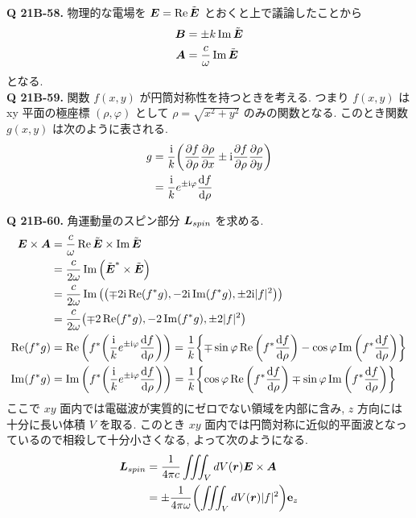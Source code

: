 \documentclass[a4paper,dvipdfmx]{jsarticle}
\theoremstyle{definition}
\begin{document}
\textbf{Q 21B-58.}
物理的な電場を $\vb*{E} = \Re\tilde{\vb*{E}}$ とおくと上で議論したことから
\begin{align}
  \vb*{B} & = \pm k\Im\tilde{\vb*{E}} \label{B tilde E} \\
  \vb*{A} & = \frac{c}{\omega}\Im\tilde{\vb*{E}}
\end{align}
となる. \\

\textbf{Q 21B-59.}
関数 $f(x,y)$ が円筒対称性を持つときを考える. つまり $f(x,y)$ は xy 平面の極座標 $(\rho, \varphi)$ として $\rho=\sqrt{x^2 + y^2}$ のみの関数となる. このとき関数 $g(x,y)$ は次のように表される.
\begin{align}
  g & = \frac{\mathrm{i}}{k}\qty(\pdv{f}{\rho}\pdv{\rho}{x}\pm\mathrm{i}\pdv{f}{\rho}\pdv{\rho}{y}) \\
    & = \frac{\mathrm{i}}{k}e^{\pm\mathrm{i}\varphi}\dv{f}{\rho} \label{def g}
\end{align}

\textbf{Q 21B-60.}
角運動量のスピン部分 $\vb*{L}_{spin}$ を求める.
\begin{align}
  \vb*{E} \times \vb*{A} & = \frac{c}{\omega}\Re\tilde{\vb*{E}}\times\Im\tilde{\vb*{E}}                                                                                                                           \\
                 & = \frac{c}{2\omega}\Im\qty(\tilde{\vb*{E}}^*\times\tilde{\vb*{E}})                                                                                                                     \\
                 & = \frac{c}{2\omega}\Im\qty(\qty(\mp 2\mathrm{i}\Re(f^*g), -2\mathrm{i}\Im(f^*g), \pm 2\mathrm{i}|f|^2))                                                                             \\
                 & = \frac{c}{2\omega}\qty(\mp 2\Re(f^*g), -2\Im(f^*g), \pm 2|f|^2)                                                                                               \\
  \Re(f^*g)      & = \Re\qty(f^*\qty(\frac{\mathrm{i}}{k}e^{\pm\mathrm{i}\varphi}\dv{f}{\rho})) = \frac{1}{k}\qty{\mp\sin\varphi\Re\qty(f^*\dv{f}{\rho}) - \cos\varphi\Im\qty(f^*\dv{f}{\rho})} \\
  \Im(f^*g)      & = \Im\qty(f^*\qty(\frac{\mathrm{i}}{k}e^{\pm\mathrm{i}\varphi}\dv{f}{\rho})) = \frac{1}{k}\qty{\cos\varphi\Re\qty(f^*\dv{f}{\rho}) \mp \sin\varphi\Im\qty(f^*\dv{f}{\rho})}
\end{align}
ここで $xy$ 面内では電磁波が実質的にゼロでない領域を内部に含み, $z$ 方向には十分に長い体積 $V$ を取る. このとき $xy$ 面内では円筒対称に近似的平面波となっているので相殺して十分小さくなる, よって次のようになる.
\begin{align}
  \vb*{L}_{spin} & = \frac{1}{4\pi c}\iiint_V dV(\vb*{r})\vb*{E}\times\vb*{A}               \\
             & = \pm\frac{1}{4\pi\omega}\qty(\iiint_V dV(\vb*{r})|f|^2)\vb{e}_z
\end{align}
\end{document}
